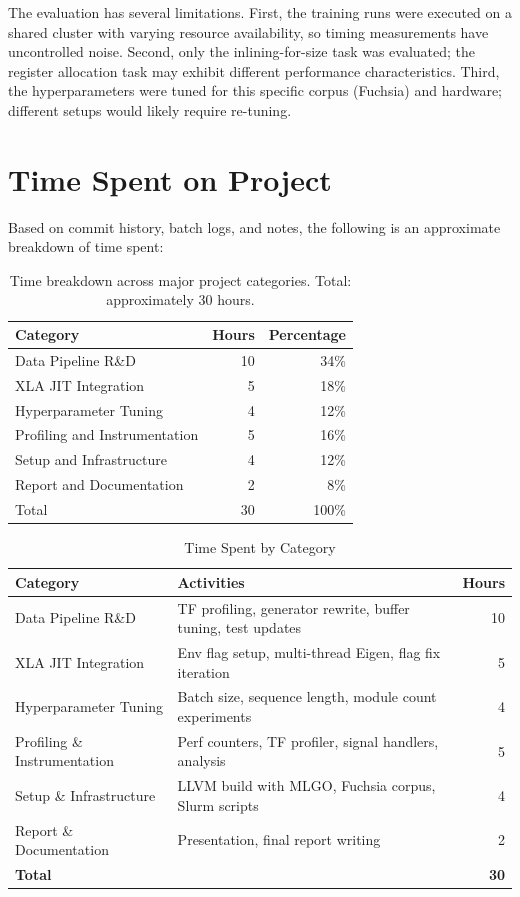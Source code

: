 \documentclass[10pt]{article}
\begin{document}
The evaluation has several limitations. First, the training runs were executed on a shared cluster with varying resource availability, so timing measurements have uncontrolled noise. Second, only the inlining-for-size task was evaluated; the register allocation task may exhibit different performance characteristics. Third, the hyperparameters were tuned for this specific corpus (Fuchsia) and hardware; different setups would likely require re-tuning.

\section{Time Spent on Project}

Based on commit history, batch logs, and notes, the following is an approximate breakdown of time spent:

\begin{table}[H]
\centering
\caption{Time breakdown across major project categories. Total: approximately 30 hours.}
\begin{tabular}{lrr}
\toprule
Category & Hours & Percentage \\
\midrule
Data Pipeline R\&D       & 10 & 34\% \\
XLA JIT Integration      &  5 & 18\% \\
Hyperparameter Tuning    &  4 & 12\% \\
Profiling and Instrumentation & 5 & 16\% \\
Setup and Infrastructure &  4 & 12\% \\
Report and Documentation &  2 &  8\% \\
\midrule
Total & 30 & 100\% \\
\bottomrule
\end{tabular}
\end{table}

\begin{table}[H]
\centering
\caption{Time Spent by Category}
\begin{tabular}{lp{3cm}r}
\toprule
Category & Activities & Hours \\
\midrule
Data Pipeline R\&D & TF profiling, generator rewrite, buffer tuning, test updates & 10 \\
XLA JIT Integration & Env flag setup, multi-thread Eigen, flag fix iteration & 5 \\
Hyperparameter Tuning & Batch size, sequence length, module count experiments & 4 \\
Profiling \& Instrumentation & Perf counters, TF profiler, signal handlers, analysis & 5 \\
Setup \& Infrastructure & LLVM build with MLGO, Fuchsia corpus, Slurm scripts & 4 \\
Report \& Documentation & Presentation, final report writing & 2 \\
\midrule
\textbf{Total} & & \textbf{30} \\
\bottomrule
\end{tabular}
\end{table}
\end{document}
